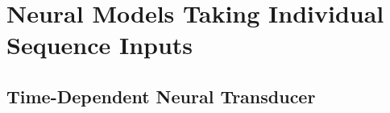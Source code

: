 \section{Neural Models Taking Individual Sequence Inputs}

\newcommand\eos{{\tt EOS}}





\subsection{Time-Dependent Neural Transducer}


